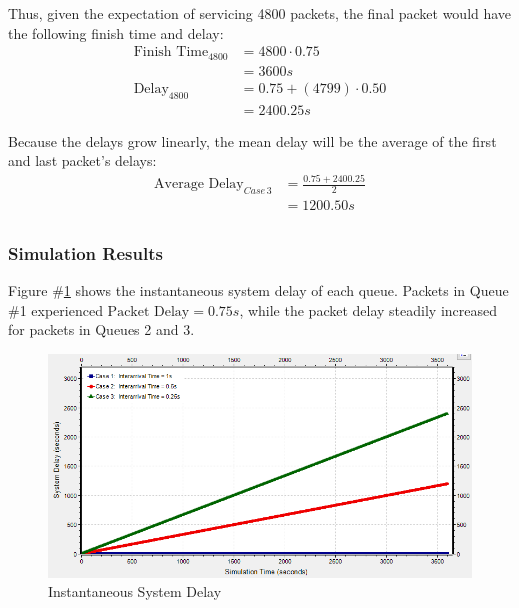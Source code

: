 \documentclass{article}
\begin{document}
\begin{enumerate}
Thus, given the expectation of servicing 4800 packets, the final packet would have the following finish time and delay:
\begin{align*}
\text{Finish Time}_{4800} &= 4800 \cdot 0.75  \\
						&= 3600s \\
\text{Delay}_{4800} &= 0.75 + (4799) \cdot 0.50  \\
				  &= 2400.25s
\end{align*}

Because the delays grow linearly, the mean delay will be the average of the first and last packet's delays:
\begin{align*}
\text{Average Delay}_{Case \, 3} &= \frac{0.75 + 2400.25}{2} \\
								&= 1200.50s \\
\end{align*}

\end{enumerate}

\vspace{-1cm}

\subsubsection*{Simulation Results}
Figure \#\ref{DelayPlot} shows the instantaneous system delay of each queue.
Packets in Queue \#1 experienced $\text{Packet Delay} = 0.75s$, while the packet delay steadily increased for packets in Queues 2 and 3.

\begin{figure}[h!]
	\begin{center}
	\includegraphics[scale=0.7]{Images/DelayPlot.PNG}
	\vspace{-.25cm}
	\caption{Instantaneous System Delay}
	\label{DelayPlot}
	\end{center}
\end{figure}
\end{document}
